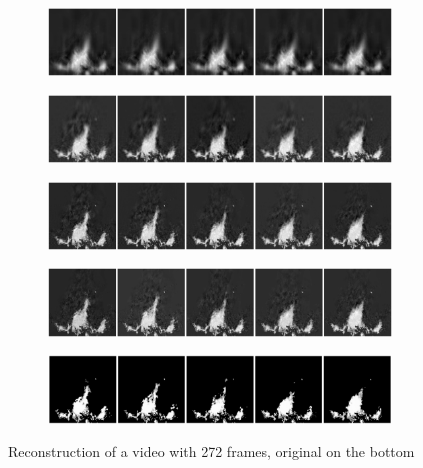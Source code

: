 \documentclass{article}
\begin{document}
\begin{figure}
	\centering
	\begin{subfigure}{\textwidth}
		\includegraphics[width=\textwidth]{visuals/Underconstrained_flicker_g1_c4_10.png}
	\end{subfigure}
	\begin{subfigure}{\textwidth}
		\includegraphics[width=\textwidth]{visuals/Underconstrained_flicker_g1_c4_50.png}
	\end{subfigure}
	\begin{subfigure}{\textwidth}
		\includegraphics[width=\textwidth]{visuals/Underconstrained_flicker_g1_c4_100.png}
	\end{subfigure}
	\begin{subfigure}{\textwidth}
		\includegraphics[width=\textwidth]{visuals/Underconstrained_flicker_g1_c4_128.png}
	\end{subfigure}
	\begin{subfigure}{\textwidth}
		\includegraphics[width=\textwidth]{visuals/Underconstrained_flicker_g1_c4.png}
	\end{subfigure}
	\caption{Reconstruction of a video with 272 frames, original on the bottom}
	\label{fig:reconstruction-1}
\end{figure}
\end{document}
